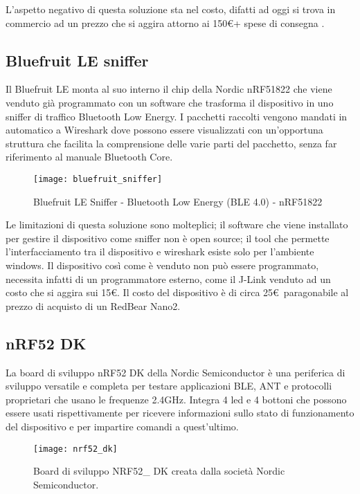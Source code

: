 L'aspetto negativo di questa soluzione sta nel costo, difatti ad oggi si trova in commercio ad un prezzo che si aggira attorno ai 150\euro  + spese di consegna \cite{ubertooth_reseller_web}.

\subsection*{Bluefruit LE sniffer}
Il Bluefruit LE monta al suo interno il chip della Nordic nRF51822 che viene venduto già programmato con un software che trasforma il dispositivo in uno sniffer di traffico Bluetooth Low Energy. I pacchetti raccolti vengono mandati in automatico a Wireshark  dove possono essere visualizzati con un'opportuna struttura che facilita la comprensione delle varie parti del pacchetto, senza far riferimento al manuale Bluetooth Core.

\begin{figure}[H]
\texttt{[image: bluefruit\_sniffer]}
\centering
\caption{Bluefruit LE Sniffer - Bluetooth Low Energy (BLE 4.0) - nRF51822}
\end{figure}

Le limitazioni di questa soluzione sono molteplici; il software che viene installato per gestire il dispositivo come sniffer non è open source; il tool che permette l'interfacciamento tra il dispositivo e wireshark esiste solo per l'ambiente windows. Il dispositivo così come è venduto non può essere programmato, necessita infatti di un programmatore esterno, come il J-Link venduto ad un costo che si aggira sui 15\euro .
Il costo del dispositivo è di circa 25\euro\ paragonabile al prezzo di acquisto di un RedBear Nano2.

\newpage 

\subsection*{nRF52 DK}\label{nordic_board}
La board di sviluppo nRF52 DK della Nordic Semiconductor è una periferica di sviluppo versatile e completa per testare applicazioni BLE, ANT e protocolli proprietari che usano le frequenze 2.4GHz. Integra 4 led e 4 bottoni che possono essere usati rispettivamente per ricevere informazioni sullo stato di funzionamento del dispositivo e per impartire comandi a quest'ultimo.

\begin{figure}[H]
\texttt{[image: nrf52\_dk]}
\centering
\caption{Board di sviluppo NRF52\_ DK creata dalla società Nordic Semiconductor.}
\end{figure}

